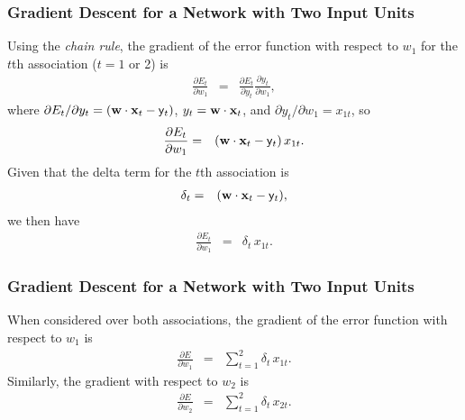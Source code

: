 \documentclass{beamer}
\makeatletter
\newcommand{\bw}{       {\bf w      } }
\newcommand{\bx}{       {\bf x      } }
\newcommand{\bea}       { \begin{eqnarray}  }
\newcommand{\eea}       { \end{eqnarray}    }
\renewcommand{\@}{\mbox{$\partial$}}
\newcommand{\ytarg} {{\tt Y}}
\renewcommand{\ytarg} {\mathsf{y}}
\makeatother
\begin{document}
\renewcommand{\d}{\partial}
\begin{frame}
  \frametitle{Gradient Descent for a Network with Two Input Units}
Using the {\em chain rule}, the gradient of the error function with respect to $w_{1}$ for the $t$th association ($t = 1$ or 2) is
%
\bea
	\frac{\partial E_{t}}{\d w_{1}} 	& = & \frac{\@ E_{t}}{\@ y_{t}}  \frac{\d y_{t}}{\d w_{1}},  \label{eqgrad1w1a}
\eea
where   ${\@ E_{t}} / {\@ y_{t}} = (\bw \cdot \bx_{t}-\ytarg_{t})$,  
$y_{t}=\bw \cdot \bx_{t}$, and 
 ${\d y_{t}} / {\d w_{1}}=x_{1t}$, 
so 
\bea
	\frac{\partial E_{t}}{\d w_{1}} 	%
							& = &  (\bw \cdot \bx_{t}-\ytarg_{t}) \, x_{1t}. \label{eqgrad1w1b}
\eea
Given that the delta term for the $t$th association is
\bea
	\delta_{t} & = &  (\bw \cdot \bx_{t}-\ytarg_{t}), \label{eqgrad1w1aERROR}
\eea
we then have
\bea
	\frac{\partial E_{t}}{\d w_{1}} & = & \delta_{t} \, x_{1t}. \label{eqgrad1w1aERRORA}
\eea

\end{frame}

\begin{frame}
  \frametitle{Gradient Descent for a Network with Two Input Units}
When considered over both associations, the gradient of the error function with respect to $w_{1}$ is
\bea
	\frac{\partial E}{\d w_{1}} & = & \sum_{t=1}^{2} \delta_{t}  \, x_{1t}. \label{eqgrad1w1}
\eea
Similarly, the gradient with respect to $w_{2}$ is
\bea
	\frac{\d E}{\d w_{2}} & = & \sum_{t=1}^{2} \delta_{t}  \, x_{2t}. \label{eqgrad1w2}
\eea
\end{frame}
\end{document}
